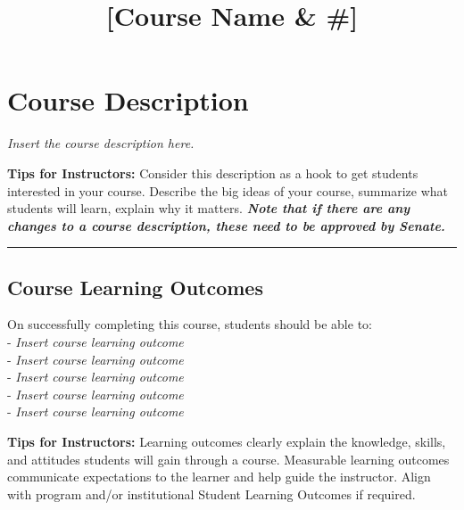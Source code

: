 \documentclass[
]{book}
\title{{[}Course Name \& \#{]}}
\author{}
\date{\vspace{-2.5em}}
\begin{document}
\maketitle

{
\setcounter{tocdepth}{1}
\tableofcontents
}
\hypertarget{course-description}{%
\chapter*{Course Description}\label{course-description}}

\emph{Insert the course description here.}

\begin{feedback}
\textbf{Tips for Instructors:} Consider this description as a hook to
get students interested in your course. Describe the big ideas of your
course, summarize what students will learn, explain why it matters.
\textbf{\emph{Note that if there are any changes to a course
description, these need to be approved by Senate.}}
\end{feedback}

\begin{center}\rule{0.5\linewidth}{0.5pt}\end{center}

\hypertarget{course-learning-outcomes}{%
\section*{Course Learning Outcomes}\label{course-learning-outcomes}}

On successfully completing this course, students should be able to:\\
- \emph{Insert course learning outcome}\\
- \emph{Insert course learning outcome}\\
- \emph{Insert course learning outcome}\\
- \emph{Insert course learning outcome}\\
- \emph{Insert course learning outcome}

\begin{feedback}
\textbf{Tips for Instructors:} Learning outcomes clearly explain the
knowledge, skills, and attitudes students will gain through a course.
Measurable learning outcomes communicate expectations to the learner and
help guide the instructor. Align with program and/or institutional
Student Learning Outcomes if required.
\end{feedback}
\end{document}
